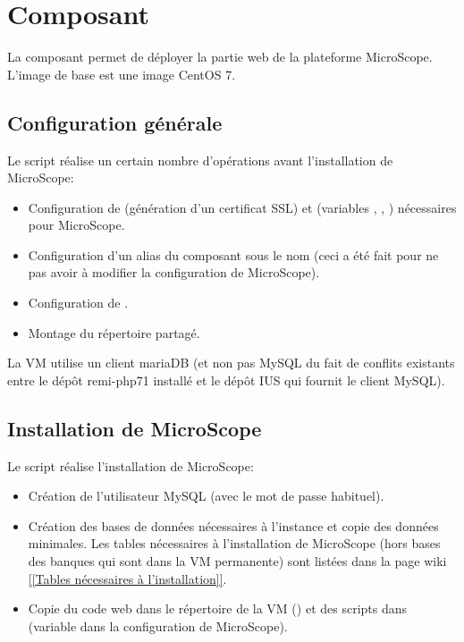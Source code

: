 \section{Composant }\label{frontend}

La composant  permet de déployer la partie web de la plateforme MicroScope.
L'image de base est une image CentOS 7.

\subsection{Configuration générale}

Le script  réalise un certain nombre d'opérations avant l'installation de MicroScope:
\begin{itemize}
    \item Configuration de  (génération d'un certificat SSL)
          et  (variables , ,  )
          nécessaires pour MicroScope.
    \item Configuration d'un alias du composant  sous le nom 
          (ceci a été fait pour ne pas avoir à modifier la configuration de MicroScope).
    \item Configuration de .
    \item Montage du répertoire partagé.
\end{itemize}

\begin{mycolorbox}
    La VM  utilise un client mariaDB (et non pas MySQL du fait de conflits existants entre le dépôt remi-php71 installé et le dépôt IUS qui fournit le client MySQL).
\end{mycolorbox}

\subsection{Installation de MicroScope}

Le script  réalise l'installation de MicroScope:
\begin{itemize}
    \item Création de l'utilisateur MySQL  (avec le mot de passe habituel).
    \item Création des bases de données nécessaires à l'instance et copie des données minimales.
          Les tables nécessaires à l'installation de MicroScope (hors bases des banques qui sont dans la VM permanente)
          sont listées dans la page wiki           \href{https://intranet.genoscope.cns.fr/agc/redmine/projects/microcloud/wiki/Tables_necessaires_a_installation}{[[Tables nécessaires à l'installation]]}.
    \item Copie du code web dans le répertoire  de la VM ()
          et des scripts dans  (variable  dans la configuration de MicroScope).
\end{itemize}

